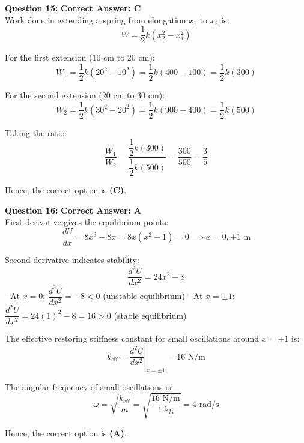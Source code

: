 \documentclass[11pt,a4paper]{article}
\begin{document}
\begin{tcolorbox}[solbox]
\textbf{\textcolor{primaryDark}{Question 15:}} \hfill \textbf{\textcolor{l1Green}{Correct Answer: C}}\\
\vspace{4pt}
Work done in extending a spring from elongation $x_1$ to $x_2$ is:
$$W = \frac{1}{2}k\left(x_2^2 - x_1^2\right)$$

For the first extension ($10\text{ cm}$ to $20\text{ cm}$):
$$W_1 = \frac{1}{2}k\left(20^2 - 10^2\right) = \frac{1}{2}k(400 - 100) = \frac{1}{2}k(300)$$

For the second extension ($20\text{ cm}$ to $30\text{ cm}$):
$$W_2 = \frac{1}{2}k\left(30^2 - 20^2\right) = \frac{1}{2}k(900 - 400) = \frac{1}{2}k(500)$$

Taking the ratio:
$$\frac{W_1}{W_2} = \frac{\dfrac{1}{2}k(300)}{\dfrac{1}{2}k(500)} = \frac{300}{500} = \frac{3}{5}$$

Hence, the correct option is \textbf{(C)}.
\end{tcolorbox}

\begin{tcolorbox}[solbox]
\textbf{\textcolor{primaryDark}{Question 16:}} \hfill \textbf{\textcolor{l1Green}{Correct Answer: A}}\\
\vspace{4pt}
First derivative gives the equilibrium points:
$$\frac{dU}{dx} = 8x^3 - 8x = 8x(x^2 - 1) = 0 \implies x = 0, \pm 1\text{ m}$$

Second derivative indicates stability:
$$\frac{d^2U}{dx^2} = 24x^2 - 8$$
- At $x = 0$: $\dfrac{d^2U}{dx^2} = -8 < 0$ (unstable equilibrium)
- At $x = \pm 1$: $\dfrac{d^2U}{dx^2} = 24(1)^2 - 8 = 16 > 0$ (stable equilibrium)

The effective restoring stiffness constant for small oscillations around $x = \pm 1$ is:
$$k_{\text{eff}} = \left.\frac{d^2U}{dx^2}\right|_{x=\pm 1} = 16\text{ N/m}$$

The angular frequency of small oscillations is:
$$\omega = \sqrt{\frac{k_{\text{eff}}}{m}} = \sqrt{\frac{16\text{ N/m}}{1\text{ kg}}} = 4\text{ rad/s}$$

Hence, the correct option is \textbf{(A)}.
\end{tcolorbox}
\end{document}
